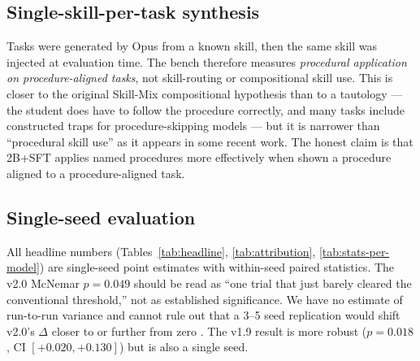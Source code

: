 \documentclass[10pt]{article}
\begin{document}
\subsection{Single-skill-per-task synthesis}
Tasks were generated by Opus from a known skill, then the same skill was injected at evaluation time. The bench therefore measures \emph{procedural application on procedure-aligned tasks}, not skill-routing or compositional skill use. This is closer to the original Skill-Mix compositional hypothesis \citep{yu2024skillmix} than to a tautology --- the student does have to follow the procedure correctly, and many tasks include constructed traps for procedure-skipping models --- but it is narrower than ``procedural skill use'' as it appears in some recent work. The honest claim is that 2B+SFT applies named procedures more effectively when shown a procedure aligned to a procedure-aligned task.

\subsection{Single-seed evaluation}
All headline numbers (Tables~\ref{tab:headline}, \ref{tab:attribution}, \ref{tab:stats-per-model}) are single-seed point estimates with within-seed paired statistics. The v2.0 McNemar $p{=}0.049$ should be read as ``one trial that just barely cleared the conventional threshold,'' not as established significance. We have no estimate of run-to-run variance and cannot rule out that a 3--5 seed replication would shift v2.0's $\Delta$ closer to or further from zero \citep{biderman2024lessons}. The v1.9 result is more robust ($p{=}0.018$, CI $[+0.020, +0.130]$) but is also a single seed.
\end{document}
